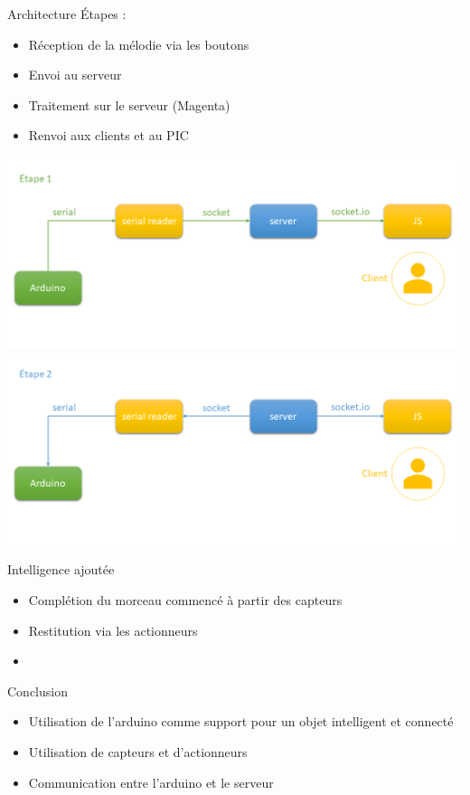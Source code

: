 \documentclass[11pt]{beamer}
\begin{document}
\begin{frame}{Architecture}
Étapes :
\begin{itemize}
    \item Réception de la mélodie via les boutons
    \item Envoi au serveur
    \item Traitement sur le serveur (Magenta)
    \item Renvoi aux clients et au PIC
\end{itemize}
\begin{center}
    \includegraphics[scale=0.23]{etape1.png}
    \includegraphics[scale=0.23]{etape2.png}
\end{center}
\end{frame}


\begin{frame}{Intelligence ajoutée}
\begin{itemize}
    \item Complétion du morceau commencé à partir des capteurs
    \item Restitution via les actionneurs
    \item 
\end{itemize}
\end{frame}

\begin{frame}{Conclusion}
\begin{itemize}
    \item Utilisation de l'arduino comme support pour un objet intelligent et connecté
    \item Utilisation de capteurs et d'actionneurs
    \item Communication entre l'arduino et le serveur
\end{itemize}
\end{frame}
\end{document}

